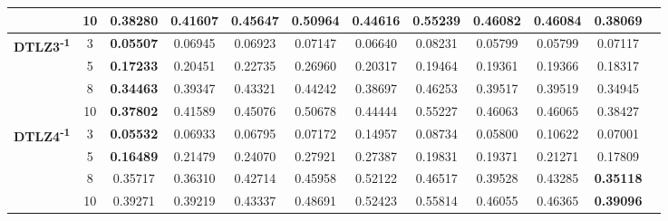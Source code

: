 \documentclass{sig-alternate}
\begin{document}
\begin{table}[!htb]
\begin{tabular}{|c|c|c|c|c|c|c|c|c|c|c|c|}
                                                      & 10         & 0.38280          & 0.41607           & 0.45647               & 0.50964          & 0.44616             & 0.55239             & 0.46082            & 0.46084              & \textbf{0.38069} \\ \hline
\multirow{4}{*}{\textbf{DTLZ3\textsuperscript{-1}}} & 3          & \textbf{0.05507} & 0.06945           & 0.06923               & 0.07147          & 0.06640             & 0.08231             & 0.05799            & 0.05799              & 0.07117          \\ \cline{2-11} 
                                                      & 5          & \textbf{0.17233} & 0.20451           & 0.22735               & 0.26960          & 0.20317             & 0.19464             & 0.19361            & 0.19366              & 0.18317          \\ \cline{2-11} 
                                                      & 8          & \textbf{0.34463} & 0.39347           & 0.43321               & 0.44242          & 0.38697             & 0.46253             & 0.39517            & 0.39519              & 0.34945          \\ \cline{2-11} 
                                                      & 10         & \textbf{0.37802} & 0.41589           & 0.45076               & 0.50678          & 0.44444             & 0.55227             & 0.46063            & 0.46065              & 0.38427          \\ \hline
\multirow{4}{*}{\textbf{DTLZ4\textsuperscript{-1}}} & 3          & \textbf{0.05532} & 0.06933           & 0.06795               & 0.07172          & 0.14957             & 0.08734             & 0.05800            & 0.10622              & 0.07001          \\ \cline{2-11} 
                                                      & 5          & \textbf{0.16489} & 0.21479           & 0.24070               & 0.27921          & 0.27387             & 0.19831             & 0.19371            & 0.21271              & 0.17809          \\ \cline{2-11} 
                                                      & 8          & 0.35717          & 0.36310           & 0.42714               & 0.45958          & 0.52122             & 0.46517             & 0.39528            & 0.43285              & \textbf{0.35118} \\ \cline{2-11} 
                                                      & 10         & 0.39271          & 0.39219           & 0.43337               & 0.48691          & 0.52423             & 0.55814             & 0.46055            & 0.46365              & \textbf{0.39096} \\ \hline

\end{tabular}
\end{table}
\end{document}
